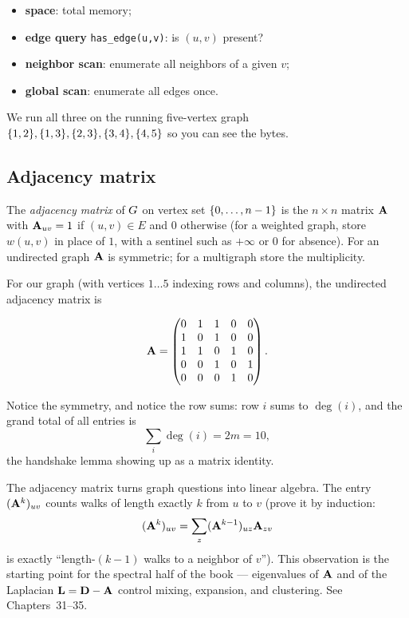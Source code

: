 \begin{itemize}
  \item \textbf{space}: total memory;
  \item \textbf{edge query} \texttt{has\_edge(u,v)}: is $(u,v)$ present?
  \item \textbf{neighbor scan}: enumerate all neighbors of a given $v$;
  \item \textbf{global scan}: enumerate all edges once.
\end{itemize}

We run all three on the running five-vertex graph
$\{1,2\},\{1,3\},\{2,3\},\{3,4\},\{4,5\}$ so you can see the bytes.

\subsection{Adjacency matrix}

\begin{definition}
\label{ch01:def-adjmatrix}
The \emph{adjacency matrix} of $G$ on vertex set $\{0,\dots,n-1\}$ is the
$n\times n$ matrix $\mathbf{A}$ with $\mathbf{A}_{uv} = 1$ if $(u,v) \in E$ and $0$
otherwise (for a weighted graph, store $w(u,v)$ in place of $1$, with a sentinel
such as $+\infty$ or $0$ for absence). For an undirected graph $\mathbf{A}$ is
symmetric; for a multigraph store the multiplicity.
\end{definition}

For our graph (with vertices $1\dots5$ indexing rows and columns), the
undirected adjacency matrix is

\[
\mathbf{A} =
\begin{pmatrix}
0 & 1 & 1 & 0 & 0 \\
1 & 0 & 1 & 0 & 0 \\
1 & 1 & 0 & 1 & 0 \\
0 & 0 & 1 & 0 & 1 \\
0 & 0 & 0 & 1 & 0
\end{pmatrix}.
\]

Notice the symmetry, and notice the row sums: row $i$ sums to $\deg(i)$, and the
grand total of all entries is 
\[ \sum_i \deg(i) = 2m = 10, \]
the handshake lemma showing up as a matrix identity.

\begin{focusbox}
The adjacency matrix turns graph questions into linear algebra. The entry
$(\mathbf{A}^k)_{uv}$ counts walks of length exactly $k$ from $u$ to $v$ (prove it by
induction: 
\[ (\mathbf{A}^{k})_{uv} = \sum_z (\mathbf{A}^{k-1})_{uz}\mathbf{A}_{zv} \]
is exactly
``length-$(k-1)$ walks to a neighbor of $v$''). This observation is the
starting point for the spectral half of the book --- eigenvalues of $\mathbf{A}$ and of
the Laplacian $\mathbf{L} = \mathbf{D} - \mathbf{A}$ control mixing, expansion, and
clustering. See Chapters~31--35.
\end{focusbox}

